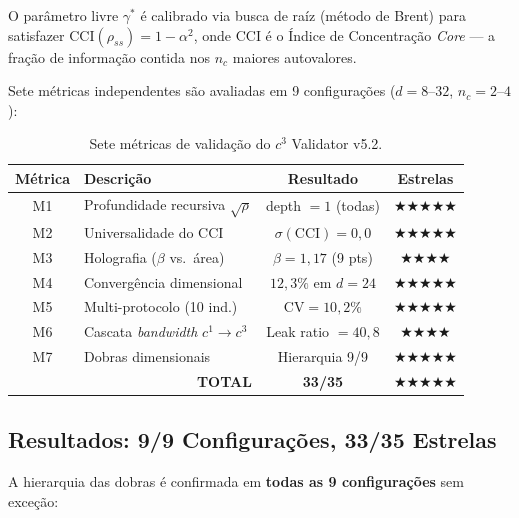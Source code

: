 \documentclass[12pt,a4paper,twoside]{article}
\newcommand{\alphaii}{\alpha^{2}}
\begin{document}
O par\^ametro livre $\gamma^*$ \'e calibrado via busca de ra\'iz (m\'etodo de Brent) para satisfazer $\text{CCI}(\rho_{ss}) = 1 - \alphaii$, onde CCI \'e o \'Indice de Concentra\c{c}\~ao \textit{Core} --- a fra\c{c}\~ao de informa\c{c}\~ao contida nos $n_c$ maiores autovalores.

Sete m\'etricas independentes s\~ao avaliadas em 9 configura\c{c}\~oes ($d = 8$--$32$, $n_c = 2$--$4$):

\begin{table}[H]
\centering
\caption{Sete m\'etricas de valida\c{c}\~ao do $c^3$ Validator v5.2.}
\label{tab:c3_metrics}
\small
\begin{tabular}{clcc}
\toprule
\textbf{M\'etrica} & \textbf{Descri\c{c}\~ao} & \textbf{Resultado} & \textbf{Estrelas} \\
\midrule
M1 & Profundidade recursiva $\sqrt{\rho}$ & depth $= 1$ (todas) & $\bigstar\bigstar\bigstar\bigstar\bigstar$ \\
M2 & Universalidade do CCI & $\sigma(\text{CCI}) = 0{,}0$ & $\bigstar\bigstar\bigstar\bigstar\bigstar$ \\
M3 & Holografia ($\beta$ vs.\ \'area) & $\beta = 1{,}17$ (9 pts) & $\bigstar\bigstar\bigstar\bigstar$ \\
M4 & Converg\^encia dimensional & $12{,}3\%$ em $d = 24$ & $\bigstar\bigstar\bigstar\bigstar\bigstar$ \\
M5 & Multi-protocolo (10 ind.) & $\text{CV} = 10{,}2\%$ & $\bigstar\bigstar\bigstar\bigstar\bigstar$ \\
M6 & Cascata \textit{bandwidth} $c^1{\to}c^3$ & Leak ratio $= 40{,}8$ & $\bigstar\bigstar\bigstar\bigstar$ \\
M7 & Dobras dimensionais & Hierarquia 9/9 & $\bigstar\bigstar\bigstar\bigstar\bigstar$ \\
\midrule
\multicolumn{2}{r}{\textbf{TOTAL}} & \textbf{33/35} & $\bigstar\bigstar\bigstar\bigstar\bigstar$ \\
\bottomrule
\end{tabular}
\end{table}

\subsection{Resultados: 9/9 Configura\c{c}\~oes, 33/35 Estrelas}

A hierarquia das dobras \'e confirmada em \textbf{todas as 9 configura\c{c}\~oes} sem exce\c{c}\~ao:
\end{document}

